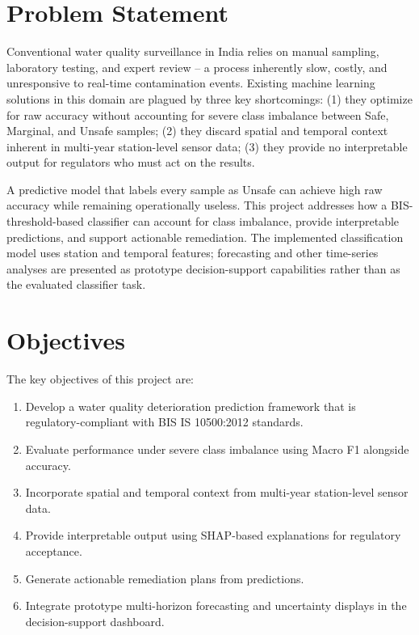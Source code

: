 \documentclass[12pt,a4paper]{report}
\numberwithin{table}{chapter}
\numberwithin{figure}{chapter}
\begin{document}
\section{Problem Statement}

Conventional water quality surveillance in India relies on manual sampling, laboratory testing, and expert review -- a process inherently slow, costly, and unresponsive to real-time contamination events. Existing machine learning solutions in this domain are plagued by three key shortcomings: (1) they optimize for raw accuracy without accounting for severe class imbalance between Safe, Marginal, and Unsafe samples; (2) they discard spatial and temporal context inherent in multi-year station-level sensor data; (3) they provide no interpretable output for regulators who must act on the results.

A predictive model that labels every sample as Unsafe can achieve high raw accuracy while remaining operationally useless. This project addresses how a BIS-threshold-based classifier can account for class imbalance, provide interpretable predictions, and support actionable remediation. The implemented classification model uses station and temporal features; forecasting and other time-series analyses are presented as prototype decision-support capabilities rather than as the evaluated classifier task.

\section{Objectives}

The key objectives of this project are:

\begin{enumerate}[leftmargin=1.5cm]
  \item Develop a water quality deterioration prediction framework that is regulatory-compliant with BIS IS 10500:2012 standards.
  \item Evaluate performance under severe class imbalance using Macro F1 alongside accuracy.
  \item Incorporate spatial and temporal context from multi-year station-level sensor data.
  \item Provide interpretable output using SHAP-based explanations for regulatory acceptance.
  \item Generate actionable remediation plans from predictions.
  \item Integrate prototype multi-horizon forecasting and uncertainty displays in the decision-support dashboard.
\end{enumerate}
\end{document}
